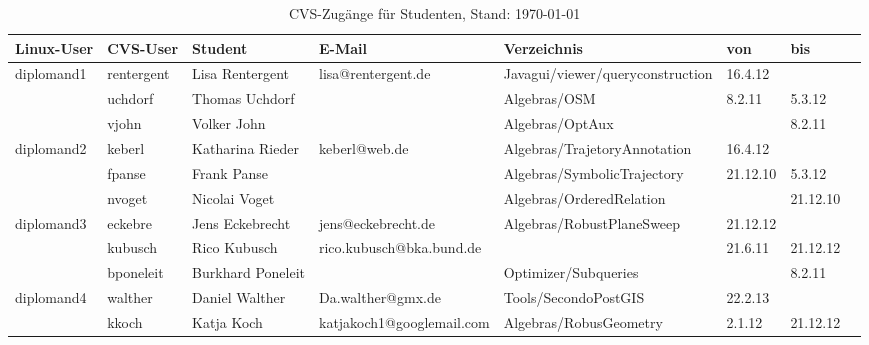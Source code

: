 \documentclass[a4paper,9pt,landscape]{scrartcl}
\begin{document}
\begin{table}
  \caption{CVS-Zug\"ange f\"ur Studenten, Stand: \today}
  \begin{tabularx}{\textwidth}{|l|l|l|l|l|X|l|l|}
  \hline \hline
\textbf{Linux-User}        &\textbf{CVS-User}        &\textbf{Student}&\textbf{E-Mail}   &\textbf{Verzeichnis}            &\textbf{von}&\textbf{bis}\\
\hline
\hline
\rowcolor{yellow}\cellcolor{green}diplomand1 &rentergent&Lisa Rentergent &lisa@rentergent.de&Javagui/viewer/queryconstruction&16.4.12     &\\
\cline{2-7}
\cellcolor{green}           &uchdorf                  &Thomas Uchdorf  &                  &Algebras/OSM                    &8.2.11      &5.3.12\\
\cline{2-7}
\cellcolor{green}           &vjohn                    &Volker John     &                  &Algebras/OptAux                 &            &8.2.11\\
\hline
\hline
\rowcolor{yellow}\cellcolor{green}diplomand2 & keberl    &Katharina Rieder&keberl@web.de&Algebras/TrajetoryAnnotation                       &16.4.12     &\\
\cline{2-7}
\cellcolor{green}           &fpanse                   &Frank Panse     &                  &Algebras/SymbolicTrajectory     &21.12.10    &5.3.12\\
\cline{2-7}
\cellcolor{green}           &nvoget                   &Nicolai Voget   &                  &Algebras/OrderedRelation        &            &21.12.10\\
\hline
\hline
\rowcolor{yellow}\cellcolor{red}diplomand3   & eckebre   &Jens Eckebrecht &jens@eckebrecht.de&Algebras/RobustPlaneSweep       &21.12.12    & \\
\cline{2-7}
\cellcolor{red}             &kubusch                  &Rico Kubusch    &rico.kubusch@bka.bund.de&                          &21.6.11     &21.12.12\\
\cline{2-7}
\cellcolor{red}             &bponeleit                &Burkhard Poneleit&                  &Optimizer/Subqueries           &            &8.2.11\\
\hline
\hline
\rowcolor{yellow}\cellcolor{red}diplomand4   & walther   &Daniel Walther  &Da.walther@gmx.de &Tools/SecondoPostGIS            &22.2.13     &\\
\cline{2-7}
\cellcolor{red}             &kkoch                    &Katja Koch      &katjakoch1@googlemail.com&Algebras/RobusGeometry   &2.1.12      &21.12.12\\

\end{tabularx}
\end{table}
\end{document}
